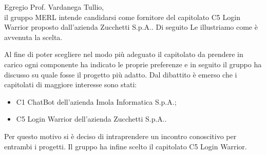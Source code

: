 Egregio Prof. Vardanega Tullio,\\
il gruppo MERL intende candidarsi come fornitore del capitolato C5 Login Warrior proposto dall’azienda Zucchetti S.p.A.. Di seguito Le illustriamo come è avvenuta la scelta.

Al fine di poter scegliere nel modo più adeguato il capitolato da prendere in carico ogni componente ha indicato le proprie preferenze e in seguito il gruppo ha discusso su quale fosse il progetto più adatto.
Dal dibattito è emerso che i capitolati di maggiore interesse sono stati:
\begin{itemize}
    \item C1 ChatBot dell’azienda Imola Informatica S.p.A.;
    \item C5 Login Warrior dell’azienda Zucchetti S.p.A..
\end{itemize}
Per questo motivo si è deciso di intraprendere un incontro conoscitivo per entrambi i progetti.
Il gruppo ha infine scelto il capitolato C5 Login Warrior.
